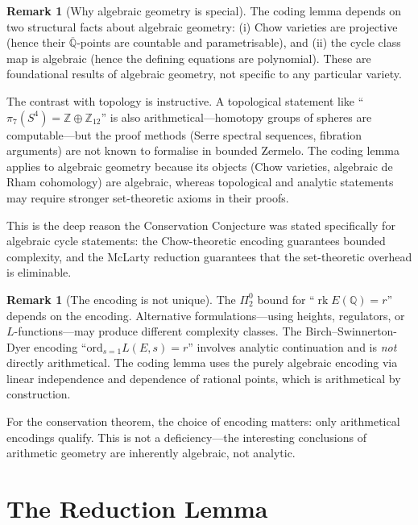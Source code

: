 \documentclass[11pt,a4paper]{article}
\theoremstyle{plain}
\theoremstyle{definition}
\newtheorem{remark}[theorem]{Remark}
\newcommand{\Z}{\mathbb{Z}}
\newcommand{\Q}{\mathbb{Q}}
\DeclareMathOperator{\rk}{rk}
\begin{document}
\begin{remark}[Why algebraic geometry is special]\label{rem:why-ag}
The coding lemma depends on two structural facts about algebraic geometry: (i) Chow varieties are projective (hence their $\overline{\Q}$-points are countable and parametrisable), and (ii) the cycle class map is algebraic (hence the defining equations are polynomial).  These are foundational results of algebraic geometry, not specific to any particular variety.

The contrast with topology is instructive.  A topological statement like ``$\pi_7(S^4) = \Z \oplus \Z_{12}$'' is also arithmetical---homotopy groups of spheres are computable---but the proof methods (Serre spectral sequences, fibration arguments) are not known to formalise in bounded Zermelo.  The coding lemma applies to algebraic geometry because its objects (Chow varieties, algebraic de Rham cohomology) are algebraic, whereas topological and analytic statements may require stronger set-theoretic axioms in their proofs.

This is the deep reason the Conservation Conjecture was stated specifically for algebraic cycle statements: the Chow-theoretic encoding guarantees bounded complexity, and the McLarty reduction guarantees that the set-theoretic overhead is eliminable.
\end{remark}

\begin{remark}[The encoding is not unique]\label{rem:encoding}
The $\Pi^0_2$ bound for ``$\rk E(\Q) = r$'' depends on the encoding.  Alternative formulations---using heights, regulators, or $L$-functions---may produce different complexity classes.  The Birch--Swinnerton-Dyer encoding ``$\mathrm{ord}_{s=1} L(E,s) = r$'' involves analytic continuation and is \emph{not} directly arithmetical.  The coding lemma uses the purely algebraic encoding via linear independence and dependence of rational points, which is arithmetical by construction.

For the conservation theorem, the choice of encoding matters: only arithmetical encodings qualify.  This is not a deficiency---the interesting conclusions of arithmetic geometry are inherently algebraic, not analytic.
\end{remark}


\section{The Reduction Lemma}\label{sec:reduction}
\end{document}
